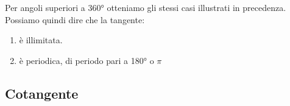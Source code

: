Per angoli superiori a \ang{360} otteniamo gli stessi casi illustrati in precedenza. 
Possiamo quindi dire che la tangente:
\begin{enumerate}
	\item è illimitata.
	\item è periodica, di periodo pari a \ang{180} o $\pi$
\end{enumerate} 
\begin{figure}
	\centering

	\label{fig:AndamentoTangente1}
\end{figure}%
\begin{figure}
	\centering
	
\label{fig:AndamentoTangente2}
\end{figure}%
\subsection{Cotangente}
\label{sec:Cotangente}

